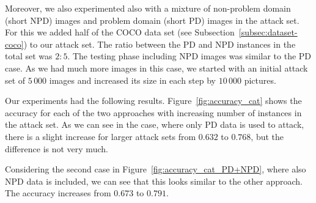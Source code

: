 \documentclass[a4paper,11pt]{article}
\begin{document}
        Moreover, we also experimented also with a mixture of non-problem domain (short NPD) images and problem domain (short PD) images in the attack set. For this we added half of the COCO data set (see Subsection~\ref{subsec:dataset-coco}) to our attack set. The ratio between the PD and NPD instances in the total set was $2:5$.
        The testing phase including NPD images was similar to the PD case. As we had much more images in this case, we started with an initial attack set of $5\,000$ images and increased its size in each step by $10\,000$ pictures.
        
        Our experiments had the following results. Figure~\ref{fig:accuracy_cat} shows the accuracy for each of the two approaches with increasing number of instances in the attack set. As we can see in the case, where only PD data is used to attack, there is a slight increase for larger attack sets from $0.632$ to $0.768$, but the difference is not very much. 
        
        Considering the second case in Figure~\ref{fig:accuracy_cat_PD+NPD}, where also NPD data is included, we can see that this looks similar to the other approach. The accuracy increases from $0.673$ to $0.791$.
        
\end{document}
